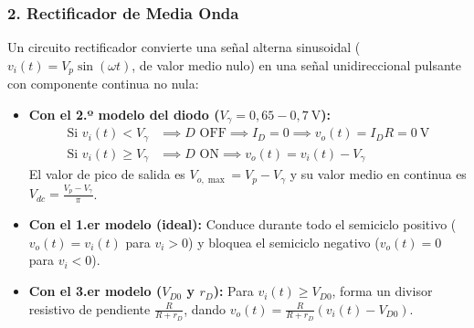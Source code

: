 \subsubsection{2. Rectificador de Media Onda}
Un circuito rectificador convierte una señal alterna sinusoidal ($v_i(t) = V_p \sin(\omega t)$, de valor medio nulo) en una señal unidireccional pulsante con componente continua no nula:
\begin{itemize}[leftmargin=*]
    \item \textbf{Con el 2.º modelo del diodo ($V_\gamma = 0{,}65 - 0{,}7\ \si{\volt}$):}
    \begin{align}
        \text{Si } v_i(t) < V_\gamma &\implies D\text{ OFF} \implies I_D = 0 \implies v_o(t) = I_D R = 0\ \si{\volt} \\
        \text{Si } v_i(t) \ge V_\gamma &\implies D\text{ ON} \implies v_o(t) = v_i(t) - V_\gamma
    \end{align}
    El valor de pico de salida es $V_{o,\max} = V_p - V_\gamma$ y su valor medio en continua es $V_{dc} = \frac{V_p - V_\gamma}{\pi}$.
    \item \textbf{Con el 1.er modelo (ideal):} Conduce durante todo el semiciclo positivo ($v_o(t) = v_i(t)$ para $v_i > 0$) y bloquea el semiciclo negativo ($v_o(t) = 0$ para $v_i < 0$).
    \item \textbf{Con el 3.er modelo ($V_{D0}$ y $r_D$):} Para $v_i(t) \ge V_{D0}$, forma un divisor resistivo de pendiente $\frac{R}{R + r_D}$, dando $v_o(t) = \frac{R}{R + r_D}\left(v_i(t) - V_{D0}\right)$.
\end{itemize}

